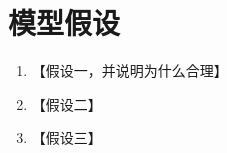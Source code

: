 \section{模型假设}

\begin{enumerate}
  \item 【假设一，并说明为什么合理】
  \item 【假设二】
  \item 【假设三】
\end{enumerate}
